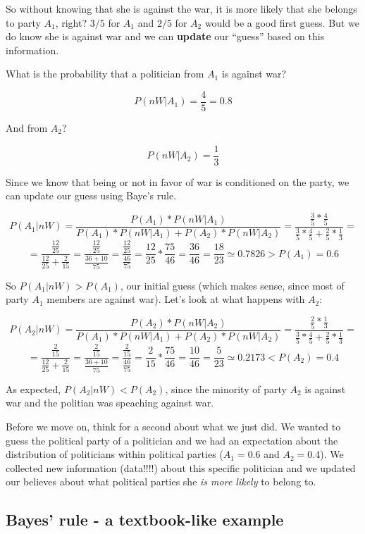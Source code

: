 \documentclass[11pt]{article}
\begin{document}
	So without knowing that she is against the war, it is more likely that she belongs to party $A_1$, right? $3/5$ for $A_1$ and $2/5$ for $A_2$ would be a good first guess. But we do know she is against war and we can \textbf{update} our ``guess'' based on this information.

	What is the probability that a politician from $A_1$ is against war? 
	
	\[P(nW|A_1) =  \frac{4}{5} = 0.8\]
	
	And from $A_2$?
	
	\[P(nW|A_2) = \frac{1}{3}\]
	
	Since we know that being or not in favor of war is conditioned on the party, we can update our guess using Baye's rule.
	
	\[P(A_1|nW) = \frac{P(A_1)*P(nW|A_1)}{P(A_1)*P(nW|A_1)+P(A_2)*P(nW|A_2)} 
	= \frac{\frac{3}{5} * \frac{4}{5}}{\frac{3}{5} * \frac{4}{5} + \frac{2}{5} * \frac{1}{3}} =\]
	\[= \frac{\frac{12}{25}}{\frac{12}{25} + \frac{2}{15}} = \frac{\frac{12}{25}}{\frac{36+10}{75}} = \frac{\frac{12}{25}}{\frac{46}{75}} = \frac{12}{25} * \frac{75}{46} = \frac{36}{46} = \frac{18}{23} \simeq 0.7826 > P(A_1) = 0.6\]	
	
	So $P(A_1|nW) > P(A_1)$, our initial guess (which makes sense, since most of party $A_1$ members are against war). Let's look at what happens with $A_2$:

	\[P(A_2|nW) = \frac{P(A_2)*P(nW|A_2)}{P(A_1)*P(nW|A_1)+P(A_2)*P(nW|A_2)} 
	= \frac{\frac{2}{5} * \frac{1}{3}}{\frac{3}{5} * \frac{4}{5} + \frac{2}{5} * \frac{1}{3}} =\]
	\[= \frac{\frac{2}{15}}{\frac{12}{25} + \frac{2}{15}} = \frac{\frac{2}{15}}{\frac{36+10}{75}} = \frac{\frac{2}{15}}{\frac{46}{75}} = \frac{2}{15} * \frac{75}{46} = \frac{10}{46} = \frac{5}{23} \simeq 0.2173 < P(A_2) = 0.4\]	

	As expected, $P(A_2|nW) < P(A_2)$, since the minority of party $A_2$ is against war and the politian was speaching against war.
	
	Before we move on, think for a second about what we just did. We wanted to guess the political party of a politician and we had an expectation about the distribution of politicians within political parties ($A_1 = 0.6$ and $A_2 = 0.4$). We collected new information (data!!!!) about this specific politician and we updated our believes about what political parties she \emph{is more likely} to belong to.

	\subsection*{Bayes' rule - a textbook-like example}
\end{document}
